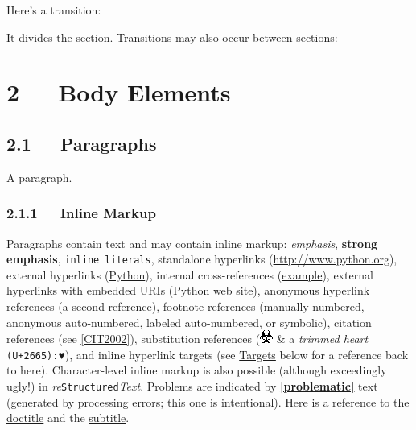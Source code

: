 \documentclass[a4paper]{article}
\begin{document}
Here’s a transition:

\DUtransition

It divides the section.  Transitions may also occur between sections:

\DUtransition


\section{2   Body Elements%
  \label{body-elements}%
}


\subsection{2.1   Paragraphs%
  \label{paragraphs}%
}

A paragraph.


\subsubsection{2.1.1   Inline Markup%
  \label{inline-markup}%
}

Paragraphs contain text and may contain inline markup: \emph{emphasis},
\textbf{strong emphasis}, \texttt{inline literals}, standalone hyperlinks
(\url{http://www.python.org}), external hyperlinks (\href{http://www.python.org/}{Python}), internal
cross-references (\hyperref[example]{example}), external hyperlinks with embedded URIs
(\href{http://www.python.org}{Python web site}), \href{http://www.python.org/}{anonymous hyperlink
references} (\href{https://docutils.sourceforge.io/}{a second reference}), footnote references (manually
numbered, anonymous auto-numbered, labeled auto-numbered, or symbolic), citation references (see \hyperlink{cit2002}{[CIT2002]}),
substitution references (\includegraphics{../../../docs/user/rst/images/biohazard.png} \&
a \emph{trimmed heart} \texttt{(U+2665):}♥), and %
\label{inline-hyperlink-targets}inline hyperlink targets
(see \hyperref[targets]{Targets} below for a reference back to here).  Character-level
inline markup is also possible (although exceedingly ugly!) in \emph{re}\texttt{Structured}\emph{Text}.  Problems are indicated by %
\hyperlink{system-message-1}{\textbf{\color{red}|problematic|}} text
(generated by processing errors; this one is intentional).  Here is a
reference to the \hyperref[doctitle]{doctitle} and the \hyperref[subtitle]{subtitle}.
\end{document}
